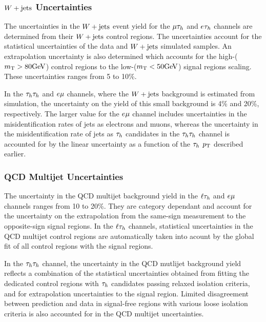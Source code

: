 \subsubsection{$W+\text{jets}$ Uncertainties}
The uncertainties in the $W+\text{jets}$ event yield for the $\mu\tau_{h}$ and $e\tau_{h}$ channels are determined 
from their $W+\text{jets}$ control regions. The uncertainties account for the statistical uncertainties of the
data and $W+\text{jets}$ simulated samples. An extrapolation uncertainty is also determined which accounts for
the high-\MT ($m_\mathrm{T}>80\mathrm{GeV}$) control regions to the low-\MT ($m_\mathrm{T}<50\mathrm{GeV}$) signal regions scaling.
These uncertainties ranges from 5 to 10\%.

In the $\tau_{h}\tau_{h}$ and $e\mu$ channels, where the $W+\text{jets}$ background is estimated from simulation, the 
uncertainty on the yield of this small background is 4\% and 20\%, respectively. The larger value for the 
$e\mu$ channel includes uncertainties in the misidentification rates of jets as electrons and muons, whereas the 
uncertainty in the misidentification rate of jets as $\tau_{h}$ candidates in the $\tau_{h}\tau_{h}$ channel is accounted for 
by the linear uncertainty as a function of the $\tau_{h}$ $p_\mathrm{T}$ described earlier.


\subsubsection{QCD Multijet Uncertainties}
The uncertainty in the QCD multijet background yield in the $\ell\tau_{h}$ and $e\mu$ channels ranges from 10 to 20\%.
They are category dependant and account for the uncertainty on the extrapolation from the same-sign measurement to 
the opposite-sign signal regions. In the  $\ell\tau_{h}$ channels, statistical uncertainties in the QCD multijet
control regions are automatically taken into acount by the global fit of all control regions with the signal regions.

In the $\tau_{h}\tau_{h}$ channel, the uncertainty in the QCD mutlijet background yield reflects a combination of the statistical
uncertainties obtained from fitting the dedicated control regions with $\tau_{h}$ candidates passing relaxed isolation 
criteria, and for extrapolation uncertainties to the signal region. Limited 
disagreement between prediction and data in signal-free regions with various loose isolation criteria is also accounted
for in the QCD multijet uncertainties. 

